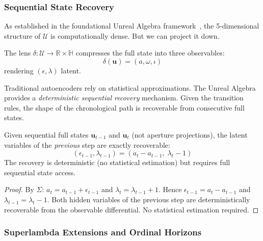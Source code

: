 \subsubsection{Sequential State Recovery}

As established in the foundational Unreal Algebra framework~\cite{larue_lc}, the 5-dimensional structure of $\mathcal{U}$ is computationally dense. But we can project it down.

\begin{definition}
The lens $\delta : \mathcal{U} \to \mathbb{R} \times \mathbb{H}$ compresses the full state into three observables:
$$\delta(\mathbf{u}) = (a, \omega, \iota)$$
rendering $({\epsilon, \lambda})$ latent.
\end{definition}

Traditional autoencoders rely on statistical approximations. The Unreal Algebra provides a \emph{deterministic sequential recovery} mechanism. Given the transition rules, the shape of the chronological path is recoverable from consecutive full states.

\begin{theorem}
Given sequential full states $\mathbf{u}_{t-1}$ and $\mathbf{u}_t$ (not aperture projections), the latent variables of the \emph{previous} step are exactly recoverable:
$$(\epsilon_{t-1}, \lambda_{t-1}) = (a_t - a_{t-1},\; \lambda_t - 1)$$
The recovery is deterministic (no statistical estimation) but requires full sequential state access.
\end{theorem}

\begin{proof}
By $\Sigma$: $a_t = a_{t-1} + \epsilon_{t-1}$ and $\lambda_t = \lambda_{t-1} + 1$. Hence $\epsilon_{t-1} = a_t - a_{t-1}$ and $\lambda_{t-1} = \lambda_t - 1$. Both hidden variables of the previous step are deterministically recoverable from the observable differential. No statistical estimation required. \qedhere
\end{proof}

\subsubsection{Superlambda Extensions and Ordinal Horizons}

